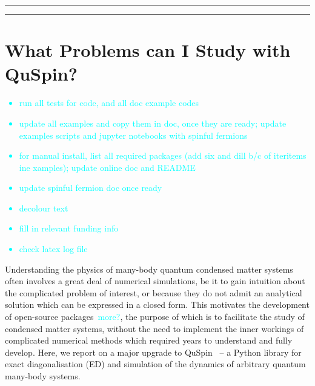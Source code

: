 \documentclass{SciPost}
\newcommand\0{\scalebox{-1}[1]{0}}
\newcommand*{\cyan}{\textcolor{cyan}}
\begin{document}
\vspace{10pt}
\noindent\rule{\textwidth}{1pt}
\tableofcontents\thispagestyle{fancy}
\noindent\rule{\textwidth}{1pt}
\vspace{10pt}


\section{What Problems can I Study with QuSpin?}
\label{sec:intro}

\cyan{
\begin{itemize}
	\item run all tests for code, and all doc example codes
	\item update all examples and copy them in doc, once they are ready; update examples scripts and jupyter notebooks with spinful fermions
	\item for manual install, list all required packages (add six and dill b/c of iteritems ine xamples); update online doc	and README
	\item update spinful fermion doc once ready
	\item decolour text
	\item fill in relevant funding info 
	\item check latex log file 	
\end{itemize}
	}

Understanding the physics of many-body quantum condensed matter systems often involves a great deal of numerical simulations, be it to gain intuition about the complicated problem of interest, or because they do not admit an analytical solution which can be expressed in a closed form. This motivates the development of open-source packages~\cite{alet05,albuquerque2007,bauer11,dolfi14,ITensor,TNT,johansson2012,johansson2013,wright_13,kramer_17,gegg_17,young_17,al_17}\cyan{more?}, the purpose of which is to facilitate the study of condensed matter systems, without the need to implement the inner workings of complicated numerical methods which required years to understand and fully develop. Here, we report on a major upgrade to QuSpin~\cite{weinberg_17_quspin} -- a Python library for exact diagonalisation (ED) and simulation of the dynamics of arbitrary quantum many-body systems. 
\end{document}
